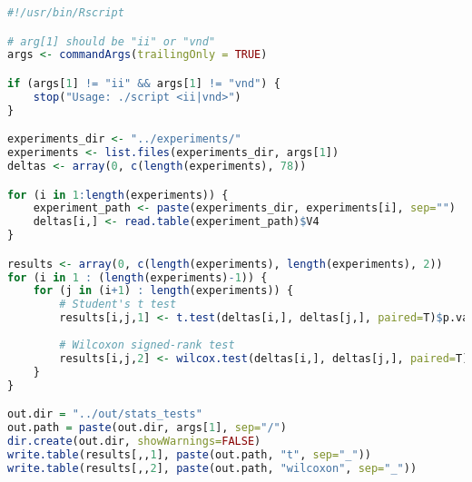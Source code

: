\begin{lstlisting}[language=R]
#!/usr/bin/Rscript

# arg[1] should be "ii" or "vnd"
args <- commandArgs(trailingOnly = TRUE)

if (args[1] != "ii" && args[1] != "vnd") {
    stop("Usage: ./script <ii|vnd>")
}

experiments_dir <- "../experiments/"
experiments <- list.files(experiments_dir, args[1])
deltas <- array(0, c(length(experiments), 78))

for (i in 1:length(experiments)) {
    experiment_path <- paste(experiments_dir, experiments[i], sep="")
    deltas[i,] <- read.table(experiment_path)$V4
}

results <- array(0, c(length(experiments), length(experiments), 2))
for (i in 1 : (length(experiments)-1)) {
    for (j in (i+1) : length(experiments)) {
        # Student's t test
        results[i,j,1] <- t.test(deltas[i,], deltas[j,], paired=T)$p.value
        
        # Wilcoxon signed-rank test
        results[i,j,2] <- wilcox.test(deltas[i,], deltas[j,], paired=T)$p.value
    }
}

out.dir = "../out/stats_tests"
out.path = paste(out.dir, args[1], sep="/")
dir.create(out.dir, showWarnings=FALSE)
write.table(results[,,1], paste(out.path, "t", sep="_"))
write.table(results[,,2], paste(out.path, "wilcoxon", sep="_"))
\end{lstlisting}

\newpage
